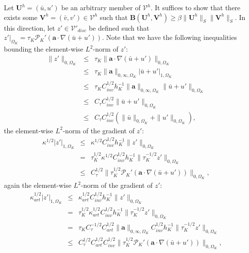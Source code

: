\documentclass[11pt]{article}
\newenvironment{proof}[1][Proof]{\begin{trivlist}
\item[\hskip \labelsep {\bfseries #1}]}{\end{trivlist}}
\begin{document}
\begin{proof}
Let $\textbf{U}^h = (\bar{u},u')$ be an arbitrary member of $\bm{\mathcal{V}}^h$.  It suffices to show that there exists some $\textbf{V}^h = (\bar{v},v') \in \bm{\mathcal{V}}^h$ such that $\textbf{B}(\textbf{U}^h,\textbf{V}^h) \geq \beta \| \textbf{U}^h \|_S \| \textbf{V}^h \|_S$.  In this direction, let $z' \in \mathcal{V}'_{disc}$ be defined such that $z'|_{\Omega_K} = \tau_K \mathcal{P}_K' \left( \bm{a} \cdot \nabla \left( \bar{u} + u' \right) \right)$.  Note that we have the following inequalities bounding the element-wise $L^2$-norm of $z'$:
\begin{eqnarray}
\| z' \|_{0,\Omega_K} &\leq& \tau_K \| \bm{a} \cdot \nabla \left( \bar{u} + u' \right) \|_{0,\Omega_K} \nonumber \\
&\leq& \tau_K \| \bm{a} \|_{0,\infty,\Omega_K} | \bar{u} + u' |_{1,\Omega_K} \nonumber \\
&\leq& \tau_K C^{1/2}_{inv} h_K^{-1} \| \bm{a} \|_{0,\infty,\Omega_K} \| \bar{u} + u' \|_{0,\Omega_K} \nonumber \\
&\leq& C_{\tau} C^{1/2}_{inv}  \| \bar{u} + u' \|_{0,\Omega_K} \nonumber \\
&\leq& C_{\tau} C^{1/2}_{inv}  \left( \| \bar{u} \|_{0,\Omega_K} +  \| u' \|_{0,\Omega_K} \right),
\end{eqnarray}
the element-wise $L^2$-norm of the gradient of $z'$:
\begin{eqnarray}
\kappa^{1/2} | z' |_{1,\Omega_K} &\leq& \kappa^{1/2} C^{1/2}_{inv} h_K^{-1} \| z' \|_{0,\Omega_K} \nonumber \\
&=& \tau^{1/2}_K \kappa^{1/2} C^{1/2}_{inv} h_K^{-1} \| \tau^{-1/2}_K z' \|_{0,\Omega_K} \nonumber \\
&\leq& C^{1/2}_{\tau} \| \tau^{1/2}_K \mathcal{P}_K' \left( \bm{a} \cdot \nabla \left( \bar{u} + u' \right) \right) \|_{0,\Omega_K},
\end{eqnarray}
again the element-wise $L^2$-norm of the gradient of $z'$:
\begin{eqnarray}
\kappa_{art}^{1/2} | z' |_{1,\Omega_K} &\leq& \kappa_{art}^{1/2} C^{1/2}_{inv} h_K^{-1} \| z' \|_{0,\Omega_K} \nonumber \\
&=& \tau^{1/2}_K \kappa_{art}^{1/2} C^{1/2}_{inv} h_K^{-1} \| \tau^{-1/2}_K z' \|_{0,\Omega_K} \nonumber \\
&=& \tau_K C^{-1/2}_{\tau} C^{1/2}_{art} \| \bm{a} \|_{0,\infty,\Omega_K} C^{1/2}_{inv} h_K^{-1} \| \tau^{-1/2}_K z' \|_{0,\Omega_K} \nonumber \\
&\leq& C^{1/2}_{\tau} C^{1/2}_{art} C^{1/2}_{inv} \| \tau^{1/2}_K \mathcal{P}_K' \left( \bm{a} \cdot \nabla \left( \bar{u} + u' \right) \right) \|_{0,\Omega_K},

\end{eqnarray}
\end{proof}
\end{document}
